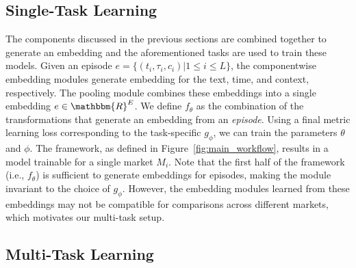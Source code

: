 \subsection{Single-Task Learning}
The components discussed in the previous sections are combined together to generate  an embedding and the aforementioned tasks are used to train these models. 
Given an episode $e = \{(t_i, \tau_i, c_i) | 1 \leq i \leq L\}$, the componentwise embedding modules generate embedding for the text, time, and context, respectively.
The pooling module combines these embeddings into a single embedding $e \in \mathbbm{R}^E$. 
We define $f_\theta$ as the combination of the transformations that generate an embedding from an \textit{episode}.
Using a final metric learning loss corresponding to the task-specific $g_\phi$, we can train the parameters $\theta$ and $\phi$.
The framework, as defined in Figure~\ref{fig:main_workflow}, results in a model trainable for a single market $M_i$. 
Note that the first half of the framework (i.e., $f_\theta$) is sufficient to generate embeddings for episodes, making the module invariant to the choice of $g_\phi$. 
However, the embedding modules learned from these embeddings may not be compatible for comparisons across different markets, which motivates our multi-task setup. 

\subsection{Multi-Task Learning}

